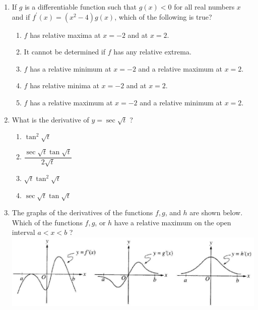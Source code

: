 \documentclass{article}
\begin{document}
\begin{enumerate}
\begin{minipage}[t]{\linewidth}
	\end{minipage}
	\item
	\begin{minipage}[t]{\linewidth}
		If \(g\) is a differentiable function such that \(g(x)<0\) for all real
numbers \(x\) and if \(f^{\prime}(x)=\left(x^{2}-4\right) g(x)\), which
of the following is true?
\vspace{1em}
		\begin{enumerate}
		\itemsep1em
			\item \({f}\) has relative maxima at \({x}=-2\) and at \({x}=2\).
			\item It cannot be determined if \(f\) has any relative extrema.
			\item \({f}\) has a relative minimum at \({x}=-2\) and a relative maximum at
\({x}=2\).
			\item \({f}\) has relative minima at \({x}=-2\) and at \({x}=2\).
			\item \({f}\) has a relative maximum at \({x}=-2\) and a relative minimum at
\({x}=2\).
		\end{enumerate}
	\end{minipage}
	\item
	\begin{minipage}[t]{\linewidth}
		What is the derivative of \({y}=\sec \sqrt{{t}}\) ?
\vspace{1em}
		\begin{enumerate}
		\itemsep1em
			\item \(\tan ^{2} \sqrt{t}\)
			\item \(\dfrac{\sec \sqrt{t} \tan \sqrt{t}}{2 \sqrt{t}}\)
			\item \(\sqrt{t} \tan ^{2} \sqrt{t}\)
			\item \(\sec \sqrt{t} \tan \sqrt{t}\)
		\end{enumerate}
	\end{minipage}
	\item
	\begin{minipage}[t]{\linewidth}
		The graphs of the derivatives of the functions \(f, g\), and \(h\) are
shown below. Which of the functions \(f, g\), or \(h\) have a relative
maximum on the open interval \(a<x<b\) ?\\
\includegraphics[width=5.013333333333334in]{media/f765d5c6-c7a8-54f4-bfaa-b2393cdce2e6.jpg}

\end{minipage}
\end{enumerate}
\end{document}
